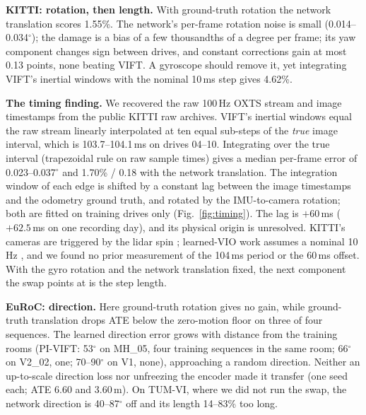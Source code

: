 \documentclass[letterpaper,journal]{IEEEtran}
\begin{document}
\textbf{KITTI: rotation, then length.} With ground-truth rotation the network translation scores 1.55\%. The network's per-frame rotation noise is small (0.014--0.034$^\circ$); the damage is a bias of a few thousandths of a degree per frame; its yaw component changes sign between drives, and constant corrections gain at most 0.13 points, none beating VIFT. A gyroscope should remove it, yet integrating VIFT's inertial windows with the nominal 10\,ms step gives 4.62\%.

\textbf{The timing finding.} We recovered the raw 100\,Hz OXTS stream and image timestamps from the public KITTI raw archives. VIFT's inertial windows equal the raw stream linearly interpolated at ten equal sub-steps of the \emph{true} image interval, which is 103.7--104.1\,ms on drives 04--10. Integrating over the true interval (trapezoidal rule on raw sample times) gives a median per-frame error of 0.023--0.037$^\circ$ and 1.70\% / 0.18 with the network translation. The integration window of each edge is shifted by a constant lag between the image timestamps and the odometry ground truth, and rotated by the IMU-to-camera rotation; both are fitted on training drives only (Fig.~\ref{fig:timing}). The lag is $+60$\,ms ($+62.5$\,ms on one recording day), and its physical origin is unresolved. KITTI's cameras are triggered by the lidar spin \cite{Geiger2013}; learned-VIO work assumes a nominal 10\,Hz \cite{Yang2022,Kurt2024,Wan2026,Almalioglu2022}, and we found no prior measurement of the 104\,ms period or the 60\,ms offset. With the gyro rotation and the network translation fixed, the next component the swap points at is the step length.

\textbf{EuRoC: direction.} Here ground-truth rotation gives no gain, while ground-truth translation drops ATE below the zero-motion floor on three of four sequences. The learned direction error grows with distance from the training rooms (PI-VIFT: 53$^\circ$ on MH\_05, four training sequences in the same room; 66$^\circ$ on V2\_02, one; 70--90$^\circ$ on V1, none), approaching a random direction. Neither an up-to-scale direction loss \cite{Wang2020} nor unfreezing the encoder made it transfer (one seed each; ATE 6.60 and 3.60\,m). On TUM-VI, where we did not run the swap, the network direction is 40--87$^\circ$ off and its length 14--83\% too long.
\end{document}
